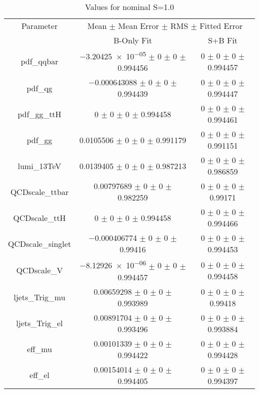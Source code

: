 \begin{table}
\centering
\caption{Values for nominal S=1.0}
\begin{tabular}{ccc}
\toprule
Parameter & \multicolumn{2}{c}{Mean $\pm$ Mean Error $\pm$ RMS $\pm$ Fitted Error}\\
 & B-Only Fit & S+B Fit\\
\midrule
pdf\_qqbar & \num{-3.20425e-05} $\pm$ \num{0} $\pm$ \num{0} $\pm$ \num{0.994456} & \num{0} $\pm$ \num{0} $\pm$ \num{0} $\pm$ \num{0.994457}\\
pdf\_qg & \num{-0.000643088} $\pm$ \num{0} $\pm$ \num{0} $\pm$ \num{0.994439} & \num{0} $\pm$ \num{0} $\pm$ \num{0} $\pm$ \num{0.994447}\\
pdf\_gg\_ttH & \num{0} $\pm$ \num{0} $\pm$ \num{0} $\pm$ \num{0.994458} & \num{0} $\pm$ \num{0} $\pm$ \num{0} $\pm$ \num{0.994461}\\
pdf\_gg & \num{0.0105506} $\pm$ \num{0} $\pm$ \num{0} $\pm$ \num{0.991179} & \num{0} $\pm$ \num{0} $\pm$ \num{0} $\pm$ \num{0.991151}\\
lumi\_13TeV & \num{0.0139405} $\pm$ \num{0} $\pm$ \num{0} $\pm$ \num{0.987213} & \num{0} $\pm$ \num{0} $\pm$ \num{0} $\pm$ \num{0.986859}\\
QCDscale\_ttbar & \num{0.00797689} $\pm$ \num{0} $\pm$ \num{0} $\pm$ \num{0.982259} & \num{0} $\pm$ \num{0} $\pm$ \num{0} $\pm$ \num{0.99171}\\
QCDscale\_ttH & \num{0} $\pm$ \num{0} $\pm$ \num{0} $\pm$ \num{0.994458} & \num{0} $\pm$ \num{0} $\pm$ \num{0} $\pm$ \num{0.994466}\\
QCDscale\_singlet & \num{-0.000406774} $\pm$ \num{0} $\pm$ \num{0} $\pm$ \num{0.99416} & \num{0} $\pm$ \num{0} $\pm$ \num{0} $\pm$ \num{0.994453}\\
QCDscale\_V & \num{-8.12926e-06} $\pm$ \num{0} $\pm$ \num{0} $\pm$ \num{0.994457} & \num{0} $\pm$ \num{0} $\pm$ \num{0} $\pm$ \num{0.994458}\\
ljets\_Trig\_mu & \num{0.00659298} $\pm$ \num{0} $\pm$ \num{0} $\pm$ \num{0.993989} & \num{0} $\pm$ \num{0} $\pm$ \num{0} $\pm$ \num{0.99418}\\
ljets\_Trig\_el & \num{0.00891704} $\pm$ \num{0} $\pm$ \num{0} $\pm$ \num{0.993496} & \num{0} $\pm$ \num{0} $\pm$ \num{0} $\pm$ \num{0.993884}\\
eff\_mu & \num{0.00101339} $\pm$ \num{0} $\pm$ \num{0} $\pm$ \num{0.994422} & \num{0} $\pm$ \num{0} $\pm$ \num{0} $\pm$ \num{0.994428}\\
eff\_el & \num{0.00154014} $\pm$ \num{0} $\pm$ \num{0} $\pm$ \num{0.994405} & \num{0} $\pm$ \num{0} $\pm$ \num{0} $\pm$ \num{0.994397}\\

\end{tabular}
\end{table}

